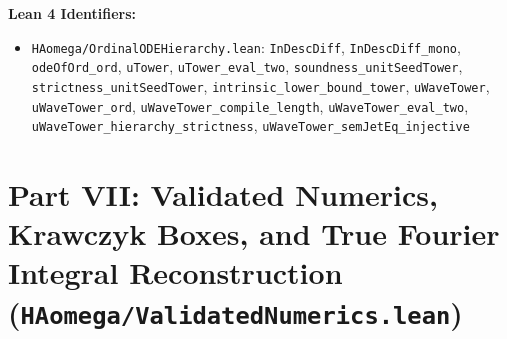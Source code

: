 \documentclass[11pt,a4paper]{article}
\newcommand{\lean}[1]{\texttt{\nolinkurl{#1}}}
\begin{document}
\begin{thmcard}
\textbf{Lean 4 Identifiers:}
\begin{itemize}
  \item \lean{HAomega/OrdinalODEHierarchy.lean}: \lean{InDescDiff}, \lean{InDescDiff_mono}, \lean{odeOfOrd_ord}, \lean{uTower}, \lean{uTower_eval_two}, \lean{soundness_unitSeedTower}, \lean{strictness_unitSeedTower}, \lean{intrinsic_lower_bound_tower}, \lean{uWaveTower}, \lean{uWaveTower_ord}, \lean{uWaveTower_compile_length}, \lean{uWaveTower_eval_two}, \lean{uWaveTower_hierarchy_strictness}, \lean{uWaveTower_semJetEq_injective}
\end{itemize}
\end{thmcard}

\newpage
\section{Part VII: Validated Numerics, Krawczyk Boxes, and True Fourier Integral Reconstruction (\texorpdfstring{\lean{HAomega/ValidatedNumerics.lean}}{HAomega/ValidatedNumerics.lean})}
\end{document}
